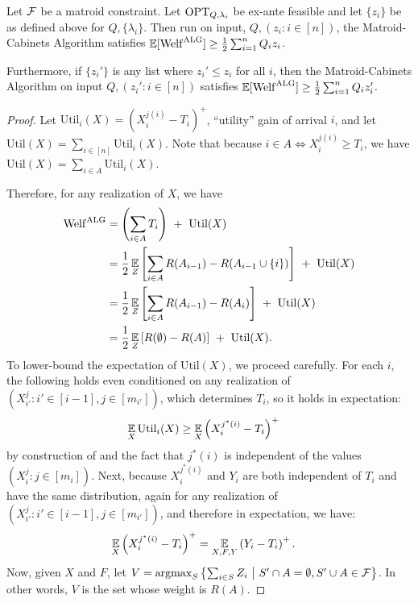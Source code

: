 \begin{lemma} \label{lemma:matroid-cabinet}
  Let $\mathcal{F}$ be a matroid constraint.
  Let $\mathrm{OPT}_{Q,\lambda_i}$ be ex-ante feasible and let $\{z_i\}$ be as defined above for $Q,\{\lambda_i\}$.
  Then run on input, $Q,(z_i : i \in [n])$, the Matroid-Cabinets Algorithm satisfies $\operatorname*{\mathbb{E}}[ \mathrm{Welf}^{\mathrm{ALG}}] \geq \frac{1}{2}\sum_{i=1}^n Q_i z_i$.

  Furthermore, if $\{z_i'\}$ is any list where $z_i' \leq z_i$ for all $i$, then the Matroid-Cabinets Algorithm on input $Q,(z_i' : i \in [n])$ satisfies  $\operatorname*{\mathbb{E}}[ \mathrm{Welf}^{\mathrm{ALG}}] \geq \frac{1}{2}\sum_{i=1}^n Q_i z_i'$.
\end{lemma}
\begin{proof}
  Let $\text{Util}_i(X) = (X_i^{j(i)} - T_i)^+$, ``utility'' gain of arrival $i$, and let $\text{Util}(X) = \sum_{i \in [n]} \text{Util}_i(X)$.
  Note that because $i \in A \iff X_i^{j(i)} \geq T_i$, we have $\text{Util}(X) = \sum_{i \in A} \text{Util}_i(X)$.

  Therefore, for any realization of $X$, we have
  \begin{align}
    \mathrm{Welf}^{\mathrm{ALG}}
    &=    \left(\sum_{i \in A} T_i \right) ~ + ~ \text{Util}(X)  \nonumber \\
    &=    \frac{1}{2} \operatorname*{\mathbb{E}}_Z \left[ \sum_{i \in A} R(A_{i-1}) - R(A_{i-1} \cup \{i\}) \right] ~ + ~ \text{Util}(X)  \nonumber \\
    &=    \frac{1}{2} \operatorname*{\mathbb{E}}_Z \left[ \sum_{i \in A} R(A_{i-1}) - R(A_i) \right] ~ + ~ \text{Util}(X) \nonumber \\
    &=    \frac{1}{2} \operatorname*{\mathbb{E}}_Z \left[ R(\emptyset) - R(A) \right] ~ + ~ \text{Util}(X) . \label{eq:matroid-saup}
  \end{align}
  To lower-bound the expectation of $\text{Util}(X)$, we proceed carefully.
  For each $i$, the following holds even conditioned on any realization of $(X_{i'}^j : i' \in [i-1], j \in [m_{i'}])$, which determines $T_i$, so it holds in expectation:
  \begin{align*}
    \operatorname*{\mathbb{E}}_X \text{Util}_i(X)
    &\geq \operatorname*{\mathbb{E}}_X \left( X_i^{j^*(i)} - T_i \right)^+
  \end{align*}
  by construction of \SAUP{} and the fact that $j^*(i)$ is independent of the values $(X_i^j : j \in [m_i])$.
  Next, because $X_i^{j^*(i)}$ and $Y_i$ are both independent of $T_i$ and have the same distribution, again for any realization of $(X_{i'}^j : i' \in [i-1], j \in [m_{i'}])$, and therefore in expectation, we have:
  \begin{align*}
    \operatorname*{\mathbb{E}}_X \left( X_i^{j^*(i)} - T_i \right)^+
    &= \operatorname*{\mathbb{E}}_{X,F,Y} \left( Y_i - T_i \right)^+ .
  \end{align*}
  Now, given $X$ and $F$, let $V = \operatorname*{argmax}_S \left\{ \sum_{i \in S} Z_i ~\middle|~ S' \cap A = \emptyset, S' \cup A \in \mathcal{F} \right\}$.
  In other words, $V$ is the set whose weight is $R(A)$.


\end{proof}
